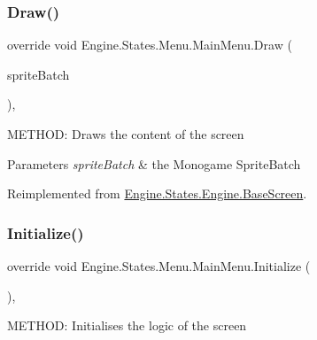 \mbox{\label{a00574_a193970cc59914f538ae0bcd39fe1ef48}} 
\subsubsection{\texorpdfstring{Draw()}{Draw()}}
{\footnotesize\ttfamily override void Engine.\+States.\+Menu.\+Main\+Menu.\+Draw (\begin{DoxyParamCaption}\item[{Sprite\+Batch}]{sprite\+Batch }\end{DoxyParamCaption})\hspace{0.3cm}{\ttfamily [inline]}, {\ttfamily [virtual]}}



M\+E\+T\+H\+OD\+: Draws the content of the screen 


\begin{DoxyParams}{Parameters}
{\em sprite\+Batch} & the Monogame Sprite\+Batch\\
\hline
\end{DoxyParams}


Reimplemented from \hyperlink{a00550_a200c31954effe5fc060118607155fb16}{Engine.\+States.\+Engine.\+Base\+Screen}.

\mbox{\label{a00574_a43b83f0941e721234fdceeb0b5587f1b}} 
\subsubsection{\texorpdfstring{Initialize()}{Initialize()}}
{\footnotesize\ttfamily override void Engine.\+States.\+Menu.\+Main\+Menu.\+Initialize (\begin{DoxyParamCaption}{ }\end{DoxyParamCaption})\hspace{0.3cm}{\ttfamily [inline]}, {\ttfamily [virtual]}}



M\+E\+T\+H\+OD\+: Initialises the logic of the screen 

